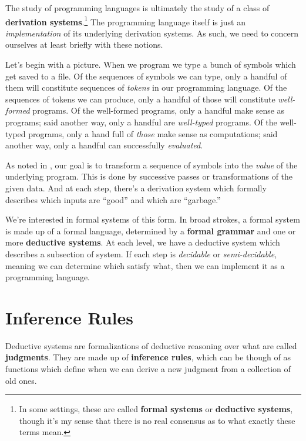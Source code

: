 The study of programming languages is ultimately the study of a class of \textbf{derivation systems}.\footnote{
  In some settings, these are called \textbf{formal systems} or \textbf{deductive systems}, though it's my sense that there is no real consensus as to what exactly these terms mean.
}
The programming language itself is just an \textit{implementation} of its underlying derivation systems.
As such, we need to concern ourselves at least briefly with these notions.

Let's begin with a picture.
When we program we type a bunch of symbols which get saved to a file.
Of the sequences of symbols we can type, only a handful of them will constitute sequences of \textit{tokens} in our programming language.
Of the sequences of tokens we can produce, only a handful of those will constitute \textit{well-formed} programs.
Of the well-formed programs, only a handful make sense as programs; said another way, only a handful are \textit{well-typed} programs.
Of the well-typed programs, only a hand full of \textit{those} make sense as computations; said another way, only a handful can successfully \textit{evaluated}.


As noted in , our goal is to transform a sequence of symbols into the \textit{value} of the underlying program.
This is done by successive passes or transformations of the given data.
And at each step, there's a derivation system which formally describes which inputs are \enquote{good} and which are \enquote{garbage.}




We're interested in formal systems of this form.  In broad strokes, a formal system is made up of a formal language, determined by a \textbf{formal grammar} and one or more \textbf{deductive systems}.
At each level, we have a deductive system which describes a subsection of system.
If each step is \textit{decidable} or \textit{semi-decidable}, meaning we can determine which satisfy what, then we can implement it as a programming language.

\section{Inference Rules}

Deductive systems are formalizations of deductive reasoning over what are called \textbf{judgments}.
They are made up of \textbf{inference rules}, which can be though of as functions which define when we can derive a new judgment from a collection of old ones.

